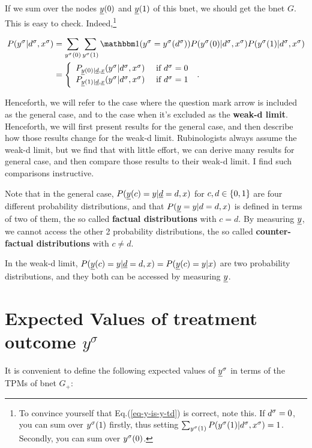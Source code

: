 If we sum over the
nodes $\rvy(0)$ and $\rvy(1)$
of this bnet, we should
get the bnet $G$.
This is easy to check. Indeed,\footnote{To
convince yourself that Eq.(\ref{eq-y-is-y-td})
 is correct, note this.
If $d^\sigma=0$, you can sum over
$y^\sigma(1)$ firstly, thus
setting $\sum_{y^\sigma(1)}P(y^\sigma(1)|d^\sigma, x^\sigma)=1$.
Secondly, you can sum over $y^\sigma(0)$.}

\begin{align}
P(y^\s|d^\s, x^\s)
&=
\sum_{y^\s(0)}
\sum_{y^\s(1)}
\indi(y^\s= y^\s(d^\s))
P(y^\s(0)|d^\s, x^\s)
P(y^\s(1)|d^\s, x^\s)
\\
&=
\left\{
\begin{array}{ll}
P_{\rvy(0)|\rvd, \rvx}(
y^\s|d^\s, x^\s)&\text{ if }
d^\s=0
\\
P_{\rvy(1)|\rvd, \rvx}(
y^\s|d^\s, x^\s)&\text{ if }
d^\s=1
\end{array}
\right.
\;.
\label{eq-y-is-y-td}
\end{align}

Henceforth,
we will refer
to the case where
the question mark
arrow is included as
the general case,
and to the case when it's excluded
as the {\bf weak-d limit}.
Henceforth, we
will first present
results for the
general case,
and then
describe how  those
results
change for the
weak-d limit.
Rubinologists
always assume the
weak-d limit, but
we find that
with little effort,
we can derive
many results for
general case, and
then compare those
results
to their weak-d limit.
I find such
comparisons instructive.

Note that in the general case,
$P(\rvy(c)=y|\rvd=d, x)$
for $c, d\in \{0,1\}$
are four
different probability
distributions,
and that
$P(\rvy=y|d=d,x)$
is defined in terms
of two of them, the
so called {\bf factual
distributions} with $c=d$.
By measuring $\rvy$,
we cannot access the other
2 probability distributions,
the so called {\bf counter-factual
distributions}
with $c\neq d$.

In the weak-d limit,
$P(\rvy(c)=y|\rvd=d, x
)=P(\rvy(c)=y|x)$ are
two probability
distributions,
and they both
can be accessed
by measuring $\rvy$.





\section{Expected Values of
 treatment outcome $y^\sigma$}

It is convenient
to define
the following
expected values of
$\rvy^\s$
in terms of the TPMs of
bnet $G_{+}$:

